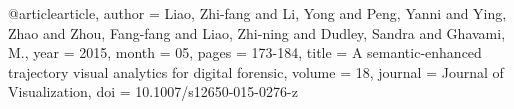 @article{article,
author = {Liao, Zhi-fang and Li, Yong and Peng, Yanni and Ying, Zhao and Zhou, Fang-fang and Liao, Zhi-ning and Dudley, Sandra and Ghavami, M.},
year = {2015},
month = {05},
pages = {173-184},
title = {A semantic-enhanced trajectory visual analytics for digital forensic},
volume = {18},
journal = {Journal of Visualization},
doi = {10.1007/s12650-015-0276-z}
}